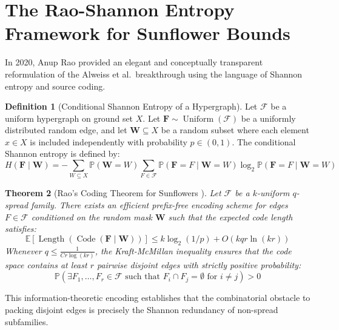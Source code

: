 \documentclass[11pt,a4paper]{article}
\newtheorem{theorem}{Theorem}[section]
\theoremstyle{definition}
\newtheorem{definition}[theorem]{Definition}
\begin{document}
\section{The Rao-Shannon Entropy Framework for Sunflower Bounds}
\label{sec:rao_entropy}

In 2020, Anup Rao \cite{rao2020} provided an elegant and conceptually transparent reformulation of the Alweiss et al.\ breakthrough using the language of Shannon entropy and source coding.

\begin{definition}[Conditional Shannon Entropy of a Hypergraph]
Let $\mathcal{F}$ be a uniform hypergraph on ground set $X$. Let $\mathbf{F} \sim \operatorname{Uniform}(\mathcal{F})$ be a uniformly distributed random edge, and let $\mathbf{W} \subseteq X$ be a random subset where each element $x \in X$ is included independently with probability $p \in (0, 1)$.
The conditional Shannon entropy is defined by:
\begin{equation}
H(\mathbf{F} \mid \mathbf{W}) = - \sum_{W \subseteq X} \mathbb{P}(\mathbf{W} = W) \sum_{F \in \mathcal{F}} \mathbb{P}(\mathbf{F} = F \mid \mathbf{W} = W) \log_2 \mathbb{P}(\mathbf{F} = F \mid \mathbf{W} = W)
\end{equation}
\end{definition}

\begin{theorem}[Rao's Coding Theorem for Sunflowers \cite{rao2020}]
Let $\mathcal{F}$ be a $k$-uniform $q$-spread family. There exists an efficient prefix-free encoding scheme for edges $F \in \mathcal{F}$ conditioned on the random mask $\mathbf{W}$ such that the expected code length satisfies:
\begin{equation}
\mathbb{E}[ \operatorname{Length}(\operatorname{Code}(\mathbf{F} \mid \mathbf{W})) ] \le k \log_2(1/p) + O(k q r \ln(k r))
\end{equation}
Whenever $q \le \frac{1}{C r \log(k r)}$, the Kraft-McMillan inequality ensures that the code space contains at least $r$ pairwise disjoint edges with strictly positive probability:
\begin{equation}
\mathbb{P}\left( \exists F_1, \dots, F_r \in \mathcal{F} \text{ such that } F_i \cap F_j = \emptyset \text{ for } i \ne j \right) > 0
\end{equation}
\end{theorem}

This information-theoretic encoding establishes that the combinatorial obstacle to packing disjoint edges is precisely the Shannon redundancy of non-spread subfamilies.
\end{document}
